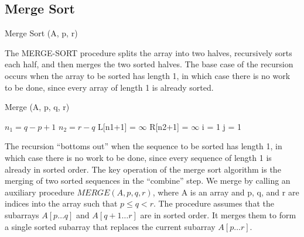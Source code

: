 \newpage

\subsection{Merge Sort}

\begin{algorithm}[H]
    \caption{Merge Sort (A, p, r)}
\end{algorithm}

The MERGE-SORT procedure splits the array into two halves, recursively sorts each half, and then merges the two sorted halves. The base case of the recursion occurs when the array to be sorted has length 1, in which case there is no work to be done, since every array of length 1 is already sorted. 
\begin{algorithm}[H]
    \caption{Merge (A, p, q, r)}
    $n_1 = q-p+1$\;
    $n_2 = r-q$\;
    L[n1+1] = $\infty$\;
    R[n2+1] = $\infty$\;
    i = 1\;
    j = 1\;
\end{algorithm}


The recursion “bottoms out” when the sequence to be sorted has length 1, in which
case there is no work to be done, since every sequence of length 1 is already in
sorted order.
The key operation of the merge sort algorithm is the merging of two sorted
sequences in the “combine” step. We merge by calling an auxiliary procedure
$MERGE(A,p,q,r)$, where A is an array and p, q, and r are indices into the array
such that $p \leq q < r$. The procedure assumes that the subarrays $A[p\dots q]$ and
$A[q+1 \dots r]$ are in sorted order. It merges them to form a single sorted subarray
that replaces the current subarray $A[p \dots r]$.

